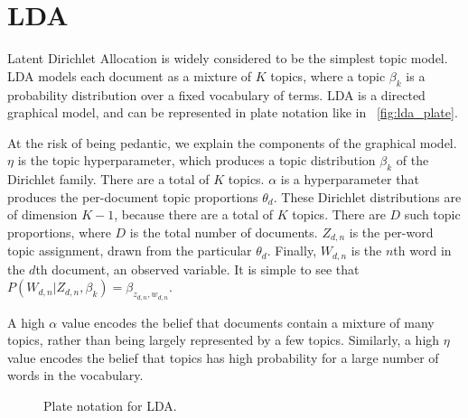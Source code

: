 \documentclass[letterpaper]{article}
\begin{document}
\section{LDA}
Latent Dirichlet Allocation is widely considered to be the simplest
topic model. LDA models each document as a mixture of $K$ topics,
where a topic $\beta_k$ is a probability distribution over a fixed
vocabulary of terms. LDA is a directed graphical model, and can be
represented in plate notation like in ~\autoref{fig:lda_plate}.

At the risk of being pedantic, we explain the components of the
graphical model. $\eta$ is the topic hyperparameter, which produces a
topic distribution $\beta_k$ of the Dirichlet family. There are a
total of $K$ topics. $\alpha$ is a hyperparameter that
produces the per-document topic proportions $\theta_d$. These
Dirichlet distributions are of dimension $K-1$, because there are a
total of $K$ topics. There are $D$ such topic proportions, where $D$
is the total number of documents. $Z_{d,n}$ is the per-word topic
assignment, drawn from the particular $\theta_d$. Finally, $W_{d,n}$
is the $n$th word in the $d$th document, an observed variable. It is
simple to see that
$P(W_{d,n} | Z_{d,n}, \beta_{k}) = \beta_{z_{d,n}, w_{d,n}}$.

A high $\alpha$ value encodes the belief that documents contain a
mixture of many topics, rather than being largely represented by a few
topics. Similarly, a high $\eta$ value encodes the belief that topics
has high probability for a large number of words in the vocabulary.

\begin{figure}[ht]
  \centering
  \caption{\label{fig:lda_plate} Plate notation for LDA.}
\end{figure}
\end{document}
